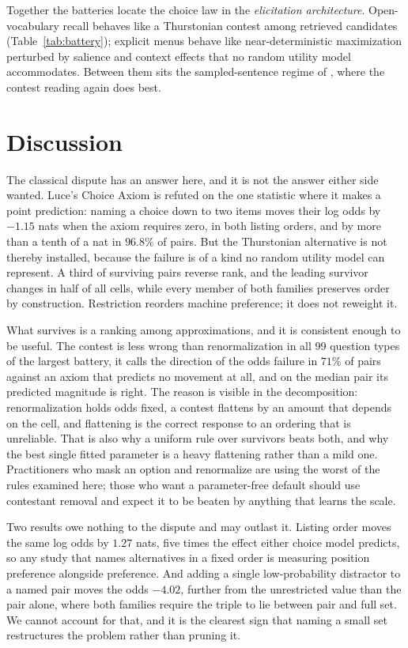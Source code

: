 \documentclass[11pt]{article}
\begin{document}
Together the batteries locate the choice law in the \emph{elicitation
architecture}. Open-vocabulary recall behaves like a Thurstonian
contest among retrieved candidates (Table~\ref{tab:battery}); explicit
menus behave like near-deterministic maximization perturbed by salience
and context effects that no random utility model accommodates. Between
them sits the sampled-sentence regime of \cite{cekinmez2026}, where the
contest reading again does best.

\section{Discussion}
\label{sec:discussion}

The classical dispute has an answer here, and it is not the answer either side
wanted. Luce's Choice Axiom is refuted on the one statistic where it makes a
point prediction: naming a choice down to two items moves their log odds by
$-1.15$ nats when the axiom requires zero, in both listing orders, and by more
than a tenth of a nat in $96.8\%$ of pairs. But the Thurstonian alternative is
not thereby installed, because the failure is of a kind no random utility model
can represent. A third of surviving pairs reverse rank, and the leading survivor
changes in half of all cells, while every member of both families preserves
order by construction. Restriction reorders machine preference; it does not
reweight it.

What survives is a ranking among approximations, and it is consistent enough to
be useful. The contest is less wrong than renormalization in all 99 question
types of the largest battery, it calls the direction of the odds failure in
$71\%$ of pairs against an axiom that predicts no movement at all, and on the
median pair its predicted magnitude is right. The reason is visible in the
decomposition: renormalization holds odds fixed, a contest flattens by an amount
that depends on the cell, and flattening is the correct response to an ordering
that is unreliable. That is also why a uniform rule over survivors beats both,
and why the best single fitted parameter is a heavy flattening rather than a mild
one. Practitioners who mask an option and renormalize are using the worst of the
rules examined here; those who want a parameter-free default should use
contestant removal and expect it to be beaten by anything that learns the scale.

Two results owe nothing to the dispute and may outlast it. Listing order moves
the same log odds by $1.27$ nats, five times the effect either choice model
predicts, so any study that names alternatives in a fixed order is measuring
position preference alongside preference. And adding a single low-probability
distractor to a named pair moves the odds $-4.02$, further from the unrestricted
value than the pair alone, where both families require the triple to lie between
pair and full set. We cannot account for that, and it is the clearest sign that
naming a small set restructures the problem rather than pruning it.
\end{document}
